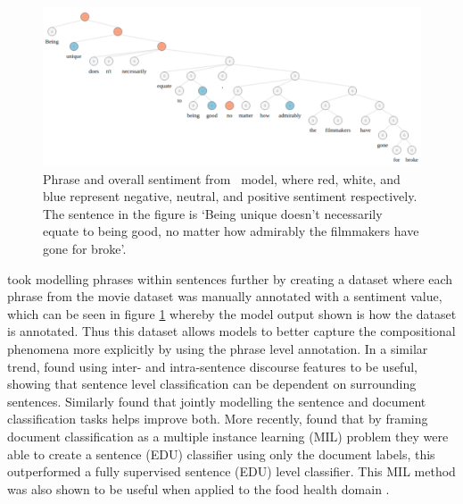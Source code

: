 \begin{figure}[!h]
    \centering
    \includegraphics[scale=0.35]{images/lit_review/sentence_sentiment_example.pdf}
    \caption{Phrase and overall sentiment from~\citet{socher-etal-2013-recursive} model, where red, white, and blue represent negative, neutral, and positive sentiment respectively. The sentence in the figure is `Being unique doesn’t necessarily equate to being good, no matter how admirably the filmmakers have gone for broke'.}
    \label{fig:lit_review_sentence_sentiment_example}
\end{figure}

\citet{socher-etal-2013-recursive} took modelling phrases within sentences further by creating a dataset where each phrase from the \citet{pang-lee-2005-seeing} movie dataset was manually annotated with a sentiment value, which can be seen in figure \ref{fig:lit_review_sentence_sentiment_example} whereby the model output shown is how the dataset is annotated. Thus this dataset allows models to better capture the compositional phenomena more explicitly by using the phrase level annotation. In a similar trend, \citet{yang-cardie-2014-context} found using inter- and intra-sentence discourse features to be useful, showing that sentence level classification can be dependent on surrounding sentences. Similarly \citet{mcdonald-etal-2007-structured} found that jointly modelling the sentence and document classification tasks helps improve both. More recently, \citet{angelidis-lapata-2018-multiple} found that by framing document classification as a multiple instance learning (MIL) \citep{dietterich1997solving} problem they were able to create a sentence (EDU) classifier using only the document labels, this outperformed a fully supervised sentence (EDU) level classifier. This MIL method was also shown to be useful when applied to the food health domain \citep{karamanolakis-etal-2019-weakly}.

